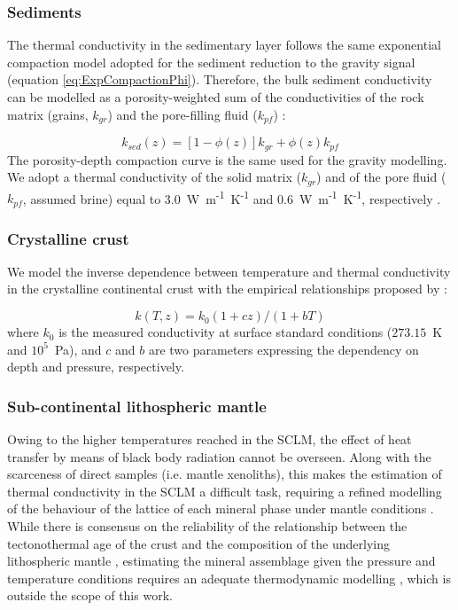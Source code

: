 \subsubsection{Sediments}
\label{sss:ThermCondSed}
The thermal conductivity in the sedimentary layer follows the same exponential compaction model adopted for the sediment reduction to the gravity signal (equation \ref{eq:ExpCompactionPhi}). Therefore, the bulk sediment conductivity can be modelled as a porosity-weighted sum of the conductivities of the rock matrix (grains, $k_{gr}$) and the pore-filling fluid ($k_{pf}$) \parencites{woodside1961}{allen2013basin}:

\begin{equation}
\label{eq:kSED}
k_{sed}(z) = [1-\phi(z)] k_{gr}+ \phi(z) k_{pf}
\end{equation}
The porosity-depth compaction curve is the same used for the gravity modelling.
We adopt a thermal conductivity of the solid matrix ($k_{gr}$) and of the pore fluid ($k_{pf}$, assumed brine) equal to 3.0~W~m\textsuperscript{-1}~K\textsuperscript{-1} and 0.6~W~m\textsuperscript{-1}~K\textsuperscript{-1}, respectively \parencite{Revil2000}.

\subsubsection{Crystalline crust}
\label{sss:ThermCondCrust}
We model the inverse dependence between temperature and thermal conductivity in the crystalline continental crust with the empirical relationships proposed by \textcite{Chapman1986}:

\begin{equation}
\label{eq:kTzChap86}
k(T,z) = k_0 (1+cz) / (1+bT)
\end{equation}
where $k_0$ is the measured conductivity at surface standard conditions ($273.15$~K and $10^5$~Pa), and $c$ and $b$ are two parameters expressing the dependency on depth and pressure, respectively.

\subsubsection{Sub-continental lithospheric mantle}
\label{sss:ThermCondSCLM}
Owing to the higher temperatures reached in the SCLM, the effect of heat transfer by means of black body radiation cannot be overseen.
Along with the scarceness of direct samples (i.e. mantle xenoliths), this makes the estimation of thermal conductivity in the SCLM a difficult task, requiring a refined modelling of the behaviour of the lattice of each mineral phase under mantle conditions \parencite{Hofmeister1999}.
While there is consensus on the reliability of the relationship between the tectonothermal age of the crust and the composition of the underlying lithospheric mantle \parencites{Afonso2008}{Griffin2009}, estimating the mineral assemblage given the pressure and temperature conditions requires an adequate thermodynamic modelling \parencite[e.g][]{Guerri2015}, which is outside the scope of this work.

